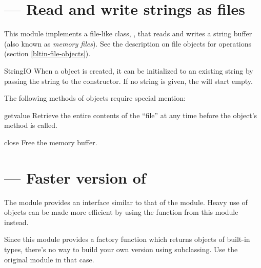 \section{ ---
         Read and write strings as files}



This module implements a file-like class, ,
that reads and writes a string buffer (also known as \emph{memory
files}). See the description on file objects for operations (section
\ref{bltin-file-objects}).

\begin{classdesc}{StringIO}{}
When a  object is created, it can be initialized
to an existing string by passing the string to the constructor.
If no string is given, the  will start empty.
\end{classdesc}

The following methods of  objects require special
mention:

\begin{methoddesc}{getvalue}{}
Retrieve the entire contents of the ``file'' at any time before the
 object's  method is called.
\end{methoddesc}

\begin{methoddesc}{close}{}
Free the memory buffer.
\end{methoddesc}


\section{ ---
         Faster version of }


The module  provides an interface similar to that of
the  module.  Heavy use of 
objects can be made more efficient by using the function
 from this module instead.

Since this module provides a factory function which returns objects of
built-in types, there's no way to build your own version using
subclassing.  Use the original  module in that case.

